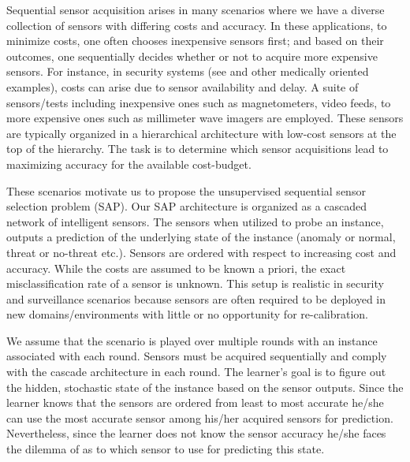 Sequential sensor acquisition arises in many scenarios where we have a diverse collection of sensors with differing costs and accuracy. In these applications, to minimize costs, one often chooses inexpensive sensors first; and based on their outcomes, one sequentially decides whether or not to acquire more expensive sensors. For instance, in security systems%
(see \cite{ML13_MultistageClassifier_TrapezSaligramaCastanon} and other medically oriented examples), costs can arise due to sensor availability and delay. A suite of sensors/tests including inexpensive ones such as magnetometers, video feeds, to more expensive ones such as millimeter wave imagers are employed. These sensors are typically organized in a hierarchical architecture with low-cost sensors at the top of the hierarchy. The task is to determine which sensor acquisitions lead to maximizing accuracy for the available cost-budget. 

These scenarios motivate us to propose the unsupervised sequential sensor selection problem (SAP). Our SAP architecture is organized as a cascaded network of intelligent sensors. The sensors when utilized to probe an instance, outputs a prediction of the underlying state of the instance (anomaly or normal, threat or no-threat etc.). Sensors are ordered with respect to increasing cost and accuracy. While the costs are assumed to be known a priori, the exact misclassification rate of a sensor is unknown. This setup is realistic in security and surveillance scenarios because sensors are often required to be deployed in new domains/environments with little or no opportunity for re-calibration. 

We assume that the scenario is played over multiple rounds with an instance associated with each round. Sensors must be acquired sequentially and comply with the cascade architecture in each round. The learner's goal is to figure out the hidden, stochastic state of the instance based on the sensor outputs. Since the learner knows that the sensors are ordered from least to most accurate he/she can use the most accurate sensor among his/her acquired sensors for prediction. Nevertheless, since the learner does not know the sensor accuracy he/she faces the dilemma of as to which sensor to use for predicting this state.



